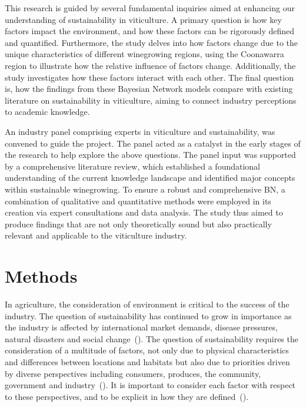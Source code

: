 \documentclass[fleqn,10pt]{wlscirep}
\begin{document}
This research is guided by several fundamental inquiries aimed at enhancing our understanding of sustainability in viticulture. A primary question is how key factors impact the environment, and how these factors can be rigorously defined and quantified. Furthermore, the study delves into how factors change due to the unique characteristics of different winegrowing regions, using the Coonawarra region to illustrate how the relative influence of factors change. Additionally, the study investigates how these factors interact with each other. The final question is, how the findings from these Bayesian Network models compare with existing literature on sustainability in viticulture, aiming to connect industry perceptions to academic knowledge.

An industry panel comprising experts in viticulture and sustainability, was convened to guide the project. The panel acted as a catalyst in the early stages of the research to help explore the above questions. The panel input was supported by a comprehensive literature review, which established a foundational understanding of the current knowledge landscape and identified major concepts within sustainable winegrowing. To ensure a robust and comprehensive BN, a combination of qualitative and quantitative methods were employed in its creation via expert consultations and data analysis. The study thus aimed to produce findings that are not only theoretically sound but also practically relevant and applicable to the viticulture industry.

\section*{Methods}

In agriculture, the consideration of environment is critical to the success of the industry. The question of sustainability has continued to grow in importance as the industry is affected by international market demands, disease pressures, natural disasters and social change~(\cite{wineaustraliaNationalVintageReport2022,wineaustraliaNationalVintageReport2020,wineaustraliaNationalVintageReport2021,cassonMultidisciplinaryApproachAssess2022}). The question of sustainability requires the consideration of a multitude of factors, not only due to physical characteristics and differences between locations and habitats but also due to priorities driven by diverse perspectives including consumers, produces, the community, government and industry~(\cite{baianoOverviewSustainabilityWine2021,wayeCarbonFootprintsFood2008}). It is important to consider each factor with respect to these perspectives, and to be explicit in how they are defined~(\cite{santiago-brownSustainabilityAssessmentWineGrape2015}).
\end{document}
